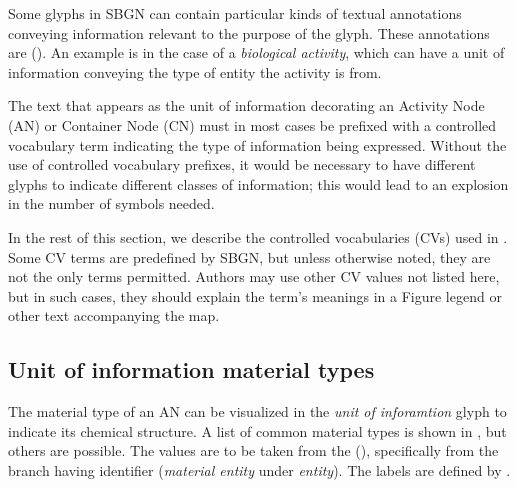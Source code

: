 
\normalcolor

Some glyphs in SBGN \AF can contain particular kinds of textual annotations conveying information relevant to the purpose of the glyph.  These annotations are  ().  An example is in the case of a \emph{biological activity}, which can have a unit of information conveying the type of entity the activity is from.

The text that appears as the unit of information decorating an Activity Node (AN) or Container Node (CN) must in most cases be prefixed with a controlled vocabulary term indicating the type of information being expressed. Without the use of controlled vocabulary prefixes, it would be necessary to have different glyphs to indicate different classes of information; this would lead to an explosion in the number of symbols needed. 

In the rest of this section, we describe the controlled vocabularies (CVs) used in \SBGNAFLone. Some CV terms are predefined by SBGN, but unless otherwise noted, they are not the only terms permitted. Authors may use other CV values not listed here, but in such cases, they should explain the term's meanings in a Figure legend or other text accompanying the map.

\subsection{Unit of information material types}
\label{sec:af:material-types-cv}

The material type of an AN can be visualized in the \emph{unit of inforamtion} glyph to indicate its chemical structure.  A list of common material types is shown in , but others are possible.  The values are to be taken from the \sbo (\sbourl), specifically from the branch having identifier  ($\!$\emph{material entity} under \emph{entity}).  The labels are defined by \SBGNAFLone.

